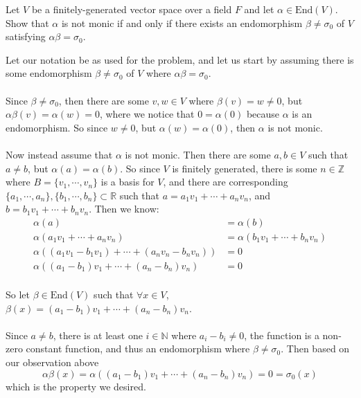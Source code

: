 \documentclass{article}
\begin{document}
\setcounter{section}{7}
\setcounter{problem}{319}
\begin{problem}
Let $V$ be a finitely-generated vector space over a field $F$ and let $\alpha\in\text{End}(V)$. Show that $\alpha$ is not monic if and only if there exists an endomorphism $\beta\ne\sigma_{0}$ of $V$ satisfying $\alpha\beta = \sigma_{0}$.
\end{problem}

\begin{solution}
Let our notation be as used for the problem, and let us start by assuming there is some endomorphism $\beta \ne \sigma_{0}$ of $V$ where $\alpha\beta = \sigma_{0}$.

\paragraph{}
Since $\beta \ne \sigma_{0}$, then there are some $v,w\in V$ where $\beta(v) = w \ne 0$, but $\alpha\beta(v) = \alpha(w) = 0$, where we notice that $0 = \alpha(0)$ because $\alpha$ is an endomorphism. So since $w \ne 0$, but $\alpha(w)=\alpha(0)$, then $\alpha$ is not monic.

\paragraph{}
Now instead assume that $\alpha$ is not monic. Then there are some $a,b\in V$ such that $a \ne b$, but $\alpha(a)=\alpha(b)$. So since $V$ is finitely generated, there is some $n\in\mathbb{Z}$ where $B=\{ v_{1}, \cdots, v_{n} \}$ is a basis for $V$, and there are corresponding $\{ a_{1}, \cdots, a_{n} \}, \{ b_{1}, \cdots, b_{n} \} \subset\mathbb{R}$ such that $a=a_{1}v_{1} + \cdots + a_{n}v_{n}$, and $b=b_{1}v_{1} + \cdots + b_{n}v_{n}$. Then we know:
\begin{align*}
\alpha(a) &= \alpha(b)\\
\alpha(a_{1}v_{1} + \cdots + a_{n}v_{n}) &= \alpha(b_{1}v_{1} + \cdots + b_{n}v_{n})\\
\alpha((a_{1}v_{1} - b_{1}v_{1}) + \cdots + (a_{n}v_{n} - b_{n}v_{n})) &= 0\\
\alpha((a_{1} - b_{1})v_{1} + \cdots + (a_{n} - b_{n})v_{n}) &= 0\\
\end{align*}

So let $\beta\in\text{End}(V)$ such that $\forall x\in V$, $\beta(x) = (a_{1} - b_{1})v_{1} + \cdots + (a_{n} - b_{n})v_{n}$.

\paragraph{}
Since $a\ne b$, there is at least one $i\in\mathbb{N}$ where $a_{i}-b_{i}\ne 0$, the function is a non-zero constant function, and thus an endomorphism where $\beta\ne\sigma_{0}$. Then based on our observation above 
\[
\alpha\beta(x) = \alpha((a_{1} - b_{1})v_{1} + \cdots + (a_{n} - b_{n})v_{n}) = 0 = \sigma_{0}(x)
\]
which is the property we desired.
\end{solution}
\end{document}

